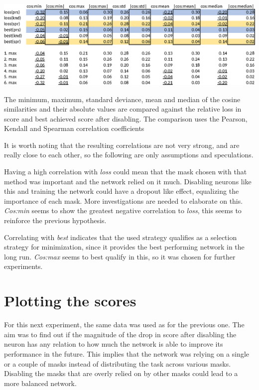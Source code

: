 \documentclass[12pt]{report}
\begin{document}
\begin{table}[!ht]
	\centering
	\includegraphics[scale=0.85]{dia/table.eps}
	\caption{The minimum, maximum, standard deviance, mean and median of the cosine similarities and their absolute values are compared against the relative loss in score and best achieved score after disabling. The comparison uses the Pearson, Kendall and Spearman correlation coefficients}
	\label{correlations}
\end{table}

It is worth noting that the resulting correlations are not very strong, and are really close to each other, so the following are only assumptions and speculations.

Having a high correlation with \textit{loss} could mean that the mask chosen with that method was important and the network relied on it much. Disabling neurons like this and training the network could have a dropout like effect, equalizing the importance of each mask. More investigations are needed to elaborate on this. \textit{Cos:min} seems to show the greatest negative correlation to \textit{loss}, this seems to reinforce the previous hypothesis.

Correlating with \textit{best} indicates that the used strategy qualifies as a selection strategy for minimization, since it provides the best performing network in the long run. \textit{Cos:max} seems to best qualify in this, so it was chosen for further experiments.

\section{Plotting the scores}
For this next experiment, the same data was used as for the previous one. The aim was to find out if the magnitude of the drop in score after disabling the neuron has any relation to how much the network is able to improve its performance in the future. This implies that the network was relying on a single or a couple of masks instead of distributing the task across various masks. Disabling the masks that are overly relied on by other masks could lead to a more balanced network.
\end{document}
